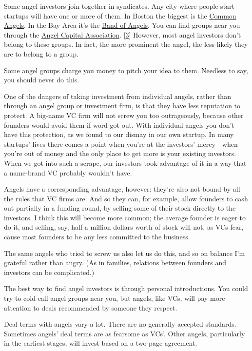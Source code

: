 Some angel investors join together in syndicates. Any city where people
start startups will have one or more of them. In Boston the biggest is
the \href{http://commonangels.com/home.html}{Common Angels}. In the Bay
Area it's the \href{http://bandangels.com/}{Band of Angels}. You can
find groups near you through the
\href{http://angelcapitalassociation.org/}{Angel Capital Association}.
{[}\hyperref[f3n]{3}{]} However, most angel investors don't belong to
these groups. In fact, the more prominent the angel, the less likely
they are to belong to a group.

Some angel groups charge you money to pitch your idea to them. Needless
to say, you should never do this.

One of the dangers of taking investment from individual angels, rather
than through an angel group or investment firm, is that they have less
reputation to protect. A big-name VC firm will not screw you too
outrageously, because other founders would avoid them if word got out.
With individual angels you don't have this protection, as we found to
our dismay in our own startup. In many startups' lives there comes a
point when you're at the investors' mercy---when you're out of money and
the only place to get more is your existing investors. When we got into
such a scrape, our investors took advantage of it in a way that a
name-brand VC probably wouldn't have.

Angels have a corresponding advantage, however: they're also not bound
by all the rules that VC firms are. And so they can, for example, allow
founders to cash out partially in a funding round, by selling some of
their stock directly to the investors. I think this will become more
common; the average founder is eager to do it, and selling, say, half a
million dollars worth of stock will not, as VCs fear, cause most
founders to be any less committed to the business.

The same angels who tried to screw us also let us do this, and so on
balance I'm grateful rather than angry. (As in families, relations
between founders and investors can be complicated.)

The best way to find angel investors is through personal introductions.
You could try to cold-call angel groups near you, but angels, like VCs,
will pay more attention to deals recommended by someone they respect.

Deal terms with angels vary a lot. There are no generally accepted
standards. Sometimes angels' deal terms are as fearsome as VCs'. Other
angels, particularly in the earliest stages, will invest based on a
two-page agreement.

